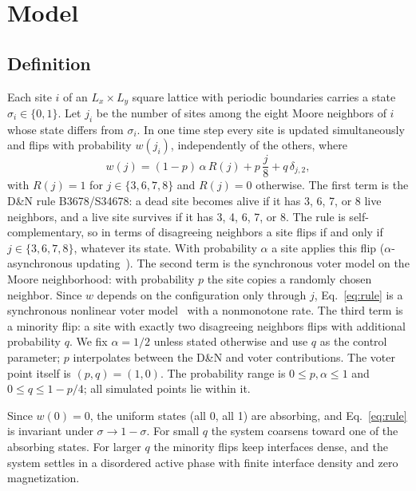 \documentclass[pre,twocolumn,superscriptaddress,showpacs,floatfix]{revtex4-2}
\begin{document}
\section{Model}
\label{sec:model}

\subsection{Definition}

Each site $i$ of an $L_x\times L_y$ square lattice with periodic boundaries carries a state
$\sigma_i\in\{0,1\}$. Let $j_i$ be the number of sites among the eight Moore neighbors of $i$
whose state differs from $\sigma_i$. In one time step every site is updated simultaneously and
flips with probability $w(j_i)$, independently of the others, where
\begin{equation}
w(j) = (1-p)\,\alpha\,R(j) + p\,\frac{j}{8} + q\,\delta_{j,2},
\label{eq:rule}
\end{equation}
with $R(j) = 1$ for $j\in\{3,6,7,8\}$ and $R(j) = 0$ otherwise. The first term is the D\&N rule
B3678/S34678: a dead site becomes alive if it has 3, 6, 7, or 8
live neighbors, and a live site survives if it has 3, 4, 6, 7, or 8. The rule is
self-complementary, so in terms of disagreeing neighbors a site flips if and only if
$j\in\{3,6,7,8\}$, whatever its state. With probability $\alpha$ a site applies this flip
($\alpha$-asynchronous updating~\cite{fates2005,blok1999}). The second term is the synchronous
voter model on the Moore neighborhood: with probability $p$ the site copies a randomly chosen
neighbor. Since $w$ depends on the configuration only through $j$, Eq.~\eqref{eq:rule} is a
synchronous nonlinear voter model~\cite{cox1991,molofsky1999,schweitzer2009} with a nonmonotone
rate. The third term is a minority flip: a site with exactly two disagreeing neighbors flips
with additional probability $q$. We fix $\alpha = 1/2$ unless stated otherwise and use $q$ as the
control parameter; $p$ interpolates between the D\&N and voter contributions.
The voter point itself is $(p,q)=(1,0)$.
The probability range is $0\le p,\alpha\le1$ and $0\le q\le1-p/4$;
all simulated points lie within it.

Since $w(0) = 0$, the uniform states (all 0, all 1) are absorbing, and Eq.~\eqref{eq:rule} is
invariant under $\sigma\to 1-\sigma$. For small $q$ the system coarsens toward one of the
absorbing states. For larger $q$ the minority flips keep interfaces dense, and the system settles
in a disordered active phase with finite interface density and zero magnetization.
\end{document}
